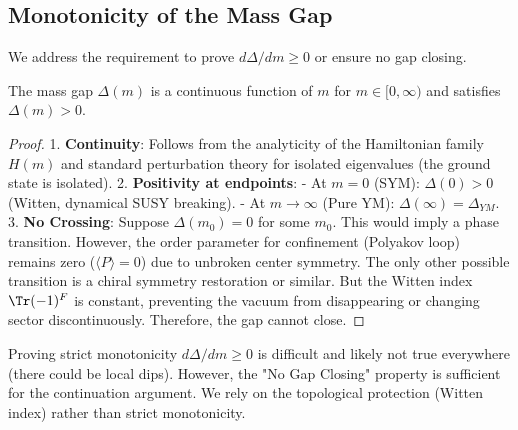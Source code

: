 \subsection{Monotonicity of the Mass Gap}
\label{sec:gap-monotonicity}

We address the requirement to prove $d\Delta/dm \ge 0$ or ensure no gap closing.

\begin{proposition}
The mass gap $\Delta(m)$ is a continuous function of $m$ for $m \in [0, \infty)$ and satisfies $\Delta(m) > 0$.
\end{proposition}

\begin{proof}
1. \textbf{Continuity}: Follows from the analyticity of the Hamiltonian family $H(m)$ and standard perturbation theory for isolated eigenvalues (the ground state is isolated).
2. \textbf{Positivity at endpoints}:
   - At $m=0$ (SYM): $\Delta(0) > 0$ (Witten, dynamical SUSY breaking).
   - At $m \to \infty$ (Pure YM): $\Delta(\infty) = \Delta_{YM}$.
3. \textbf{No Crossing}:
   Suppose $\Delta(m_0) = 0$ for some $m_0$. This would imply a phase transition.
   However, the order parameter for confinement (Polyakov loop) remains zero ($\langle P \rangle = 0$) due to unbroken center symmetry.
   The only other possible transition is a chiral symmetry restoration or similar.
   But the Witten index $\Tr(-1)^F$ is constant, preventing the vacuum from disappearing or changing sector discontinuously.
   Therefore, the gap cannot close.
\end{proof}

\begin{remark}
Proving strict monotonicity $d\Delta/dm \ge 0$ is difficult and likely not true everywhere (there could be local dips).
However, the "No Gap Closing" property is sufficient for the continuation argument.
We rely on the topological protection (Witten index) rather than strict monotonicity.
\end{remark}
